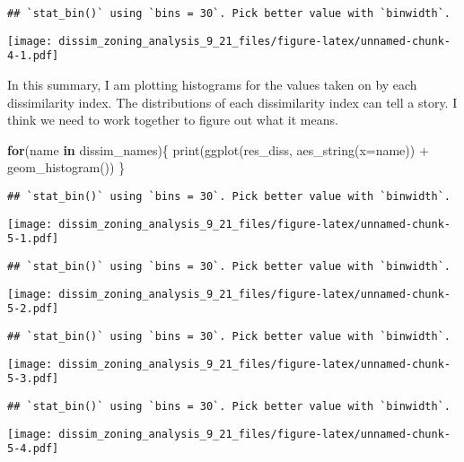 \documentclass[
]{article}
\newenvironment{Shaded}{\begin{snugshade}}{\end{snugshade}}
\newcommand{\AttributeTok}[1]{\textcolor[rgb]{0.77,0.63,0.00}{#1}}
\newcommand{\ControlFlowTok}[1]{\textcolor[rgb]{0.13,0.29,0.53}{\textbf{#1}}}
\newcommand{\FunctionTok}[1]{\textcolor[rgb]{0.00,0.00,0.00}{#1}}
\newcommand{\NormalTok}[1]{#1}
\newcommand{\SpecialCharTok}[1]{\textcolor[rgb]{0.00,0.00,0.00}{#1}}
\begin{document}
\begin{verbatim}
## `stat_bin()` using `bins = 30`. Pick better value with `binwidth`.
\end{verbatim}

\texttt{[image: dissim\_zoning\_analysis\_9\_21\_files/figure-latex/unnamed-chunk-4-1.pdf]}

In this summary, I am plotting histograms for the values taken on by
each dissimilarity index. The distributions of each dissimilarity index
can tell a story. I think we need to work together to figure out what it
means.

\begin{Shaded}
\begin{Highlighting}[]
\ControlFlowTok{for}\NormalTok{(name }\ControlFlowTok{in}\NormalTok{ dissim\_names)\{}
\FunctionTok{print}\NormalTok{(}\FunctionTok{ggplot}\NormalTok{(res\_diss, }\FunctionTok{aes\_string}\NormalTok{(}\AttributeTok{x=}\NormalTok{name)) }\SpecialCharTok{+} \FunctionTok{geom\_histogram}\NormalTok{())}
\NormalTok{\}}
\end{Highlighting}
\end{Shaded}

\begin{verbatim}
## `stat_bin()` using `bins = 30`. Pick better value with `binwidth`.
\end{verbatim}

\texttt{[image: dissim\_zoning\_analysis\_9\_21\_files/figure-latex/unnamed-chunk-5-1.pdf]}

\begin{verbatim}
## `stat_bin()` using `bins = 30`. Pick better value with `binwidth`.
\end{verbatim}

\texttt{[image: dissim\_zoning\_analysis\_9\_21\_files/figure-latex/unnamed-chunk-5-2.pdf]}

\begin{verbatim}
## `stat_bin()` using `bins = 30`. Pick better value with `binwidth`.
\end{verbatim}

\texttt{[image: dissim\_zoning\_analysis\_9\_21\_files/figure-latex/unnamed-chunk-5-3.pdf]}

\begin{verbatim}
## `stat_bin()` using `bins = 30`. Pick better value with `binwidth`.
\end{verbatim}

\texttt{[image: dissim\_zoning\_analysis\_9\_21\_files/figure-latex/unnamed-chunk-5-4.pdf]}
\end{document}
